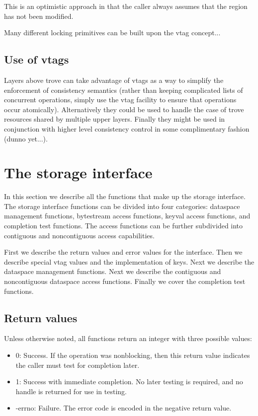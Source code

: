 \documentclass[10pt]{article} %
\begin{document}
This is an optimistic approach in that the caller always assumes that
the region has not been modified.  

Many different locking primitives can be built upon the vtag concept...

\subsection{Use of vtags}

Layers above trove can take advantage of vtags as a way to simplify the
enforcement of consistency semantics (rather than keeping complicated lists of
concurrent operations, simply use the vtag facility to ensure that operations
occur atomically).  Alternatively they could be used to handle the case of
trove resources shared by multiple upper layers.  Finally they might be used
in conjunction with higher level consistency control in some complimentary
fashion (dunno yet...).

%
%
\section{The storage interface}

In this section we describe all the functions that make up the storage
interface.  The storage interface functions can be divided into four
categories: dataspace management functions, bytestream access functions,
keyval access functions, and completion test functions.  The access
functions can be further subdivided into contiguous and noncontiguous
access capabilities.

First we describe the return values and error values for the interface.
Then we describe special vtag values and the implementation of keys.
Next we describe the dataspace management functions.  Next we
describe the contiguous and noncontiguous dataspace access functions.
Finally we cover the completion test functions.

\subsection{Return values}

Unless otherwise noted, all functions return an integer with three
possible values:
\begin{itemize}
\item 0: Success.  If the operation was nonblocking, then this return
  value indicates the caller must test for completion later.
\item 1: Success with immediate completion.  No later testing is required, and
  no handle is returned for use in testing.
\item -errno: Failure.  The error code is encoded in the negative return
value.
\end{itemize}
\end{document}

